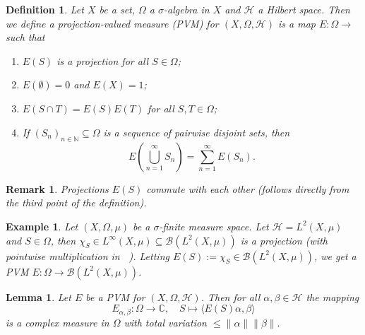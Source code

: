 \documentclass[10pt, a4paper]{article}
\newtheorem{defi}[thm]{Definition}
\newenvironment{noticeB}{%
  \tcolorbox[%
  notitle,
  empty,
  enhanced,  %
  breakable,
  coltext=black,
  colback=white, 
  fontupper=\rmfamily,
  noparskip,
  sharp corners,
  boxrule=-1pt,  %
  frame hidden,
  left=7pt,  %
  right=7pt,
  top=5pt,
  bottom=5pt,
  before skip=2.5ex plus 2pt,
  after skip=2.5ex plus 2pt,
  borderline west = {1.5pt}{-0.1pt}{blue!30!black}, %
  overlay unbroken and last={%
    \draw[color=black, line width=1.25pt]
    ($(frame.south west)+(1.pt, -0.1pt)$) -- ++(2em, 0);
  }
  ]}
{\endtcolorbox}
\newenvironment{definition}{\begin{noticeB}\begin{defi}}{%
    \end{defi}\end{noticeB}}
\newtheorem*{remark}{Remark}
\newtheorem{example}[thm]{Example}
\newtheorem{lemma}[thm]{Lemma}
\newcommand{\N}{\mathbb {N}}
\newcommand{\C}{\mathbb {C}}
\DeclareMathOperator{\bh}{\mathcal{B} (\mathcal{H})}
\begin{document}
\begin{definition}
  Let $X$ be a set, $\Omega$ a $\sigma$-algebra in $X$ and $\mathcal{H}$ a Hilbert space.
  Then we define a projection-valued measure (PVM) for $(X, \Omega, \mathcal{H})$ is a map 
  $E: \Omega \to \bh$ such that 
  \begin{enumerate}
    \item $E(S)$ is a projection for all $S \in \Omega$;
    \item $E(\emptyset) = 0$ and $E(X) = 1$;
    \item $E(S \cap T) = E(S) E(T)$ for all $S, T \in \Omega$;
    \item If $(S_n)_{n \in \N} \subseteq \Omega$ is a sequence of pairwise disjoint sets, then 
    $$E (\bigcup_{n = 1} ^\infty S_n) = \sum_{n = 1} ^\infty E(S_n).$$
  \end{enumerate}
\end{definition}

\begin{remark}
  Projections $E (S)$ commute with each other (follows directly from the third point of the definition).
\end{remark}

\begin{example}
  Let $(X, \Omega, \mu)$ be a $\sigma$-finite measure space.
  Let $\mathcal{H} = L^2 (X, \mu)$ and $S \in \Omega$, then 
  $\chi_S \in L^\infty (X, \mu) \subseteq \mathcal{B} (L^2 (X, \mu))$ is a projection (with pointwise multiplication in $\bh$).
  Letting $E(S) := \chi_S \in \mathcal{B} (L^2 (X, \mu))$, we get a PVM $E: \Omega \to \mathcal{B}(L^2 (X, \mu))$.
\end{example}

\begin{lemma}
  Let $E$ be a PVM for $(X, \Omega, \mathcal{H})$. Then for all $\alpha, \beta \in \mathcal{H}$ the mapping 
  $$E_{\alpha, \beta} : \Omega \to \C,\quad S \mapsto \langle E(S) \alpha, \beta\rangle$$
  is a complex measure in $\Omega$ with total variation $\leq \|\alpha\| \|\beta\|.$
\end{lemma}
\end{document}
